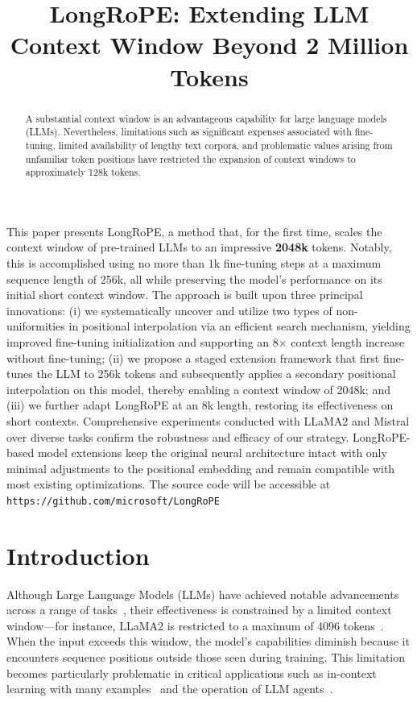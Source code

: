 \title{LongRoPE: Extending LLM Context Window Beyond 2 Million Tokens}

\begin{abstract}
A substantial context window is an advantageous capability for large language models (LLMs). Nevertheless, limitations such as significant expenses associated with fine-tuning, limited availability of lengthy text corpora, and problematic values arising from unfamiliar token positions have restricted the expansion of context windows to approximately 128k tokens.
\end{abstract}

This paper presents LongRoPE, a method that, for the first time, scales the context window of pre-trained LLMs to an impressive \textbf{2048k} tokens. Notably, this is accomplished using no more than 1k fine-tuning steps at a maximum sequence length of 256k, all while preserving the model’s performance on its initial short context window. The approach is built upon three principal innovations: (i) we systematically uncover and utilize two types of non-uniformities in positional interpolation via an efficient search mechanism, yielding improved fine-tuning initialization and supporting an 8$\times$ context length increase without fine-tuning; (ii) we propose a staged extension framework that first fine-tunes the LLM to 256k tokens and subsequently applies a secondary positional interpolation on this model, thereby enabling a context window of 2048k; and (iii) we further adapt LongRoPE at an 8k length, restoring its effectiveness on short contexts. Comprehensive experiments conducted with LLaMA2 and Mistral over diverse tasks confirm the robustness and efficacy of our strategy. LongRoPE-based model extensions keep the original neural architecture intact with only minimal adjustments to the positional embedding and remain compatible with most existing optimizations. The source code will be accessible at \texttt{https://github.com/microsoft/LongRoPE}

\section{Introduction}

Although Large Language Models (LLMs) have achieved notable advancements across a range of tasks~\cite{gpt4,llama2}, their effectiveness is constrained by a limited context window—for instance, LLaMA2 is restricted to a maximum of 4096 tokens~\cite{llama2}. When the input exceeds this window, the model’s capabilities diminish because it encounters sequence positions outside those seen during training. This limitation becomes particularly problematic in critical applications such as in-context learning with many examples~\cite{Huang2023FewerIM} and the operation of LLM agents~\cite{park2023generative,madaan2023selfrefine}.

